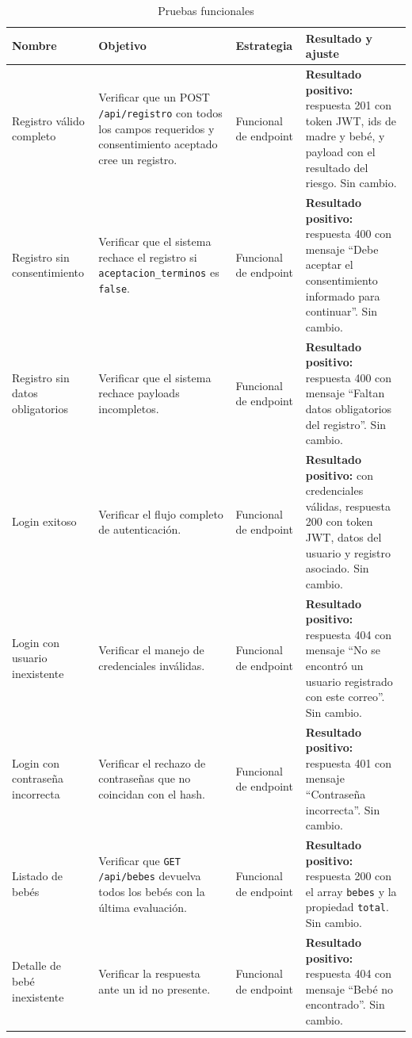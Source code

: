 \documentclass[12pt,letterpaper]{article}
\begin{document}
\begin{longtable}{p{}p{}p{}p{}}
\caption{Pruebas funcionales}\\\toprule
\textbf{Nombre} & \textbf{Objetivo} & \textbf{Estrategia} & \textbf{Resultado y ajuste} \\\midrule
\endhead
Registro válido completo & Verificar que un POST \texttt{/api/registro} con todos los campos requeridos y consentimiento aceptado cree un registro. & Funcional de endpoint & \textbf{Resultado positivo:} respuesta 201 con token JWT, ids de madre y bebé, y payload con el resultado del riesgo. Sin cambio.\\\hline
Registro sin consentimiento & Verificar que el sistema rechace el registro si \texttt{aceptacion\_terminos} es \texttt{false}. & Funcional de endpoint & \textbf{Resultado positivo:} respuesta 400 con mensaje ``Debe aceptar el consentimiento informado para continuar''. Sin cambio.\\\hline
Registro sin datos obligatorios & Verificar que el sistema rechace payloads incompletos. & Funcional de endpoint & \textbf{Resultado positivo:} respuesta 400 con mensaje ``Faltan datos obligatorios del registro''. Sin cambio.\\\hline
Login exitoso & Verificar el flujo completo de autenticación. & Funcional de endpoint & \textbf{Resultado positivo:} con credenciales válidas, respuesta 200 con token JWT, datos del usuario y registro asociado. Sin cambio.\\\hline
Login con usuario inexistente & Verificar el manejo de credenciales inválidas. & Funcional de endpoint & \textbf{Resultado positivo:} respuesta 404 con mensaje ``No se encontró un usuario registrado con este correo''. Sin cambio.\\\hline
Login con contraseña incorrecta & Verificar el rechazo de contraseñas que no coincidan con el hash. & Funcional de endpoint & \textbf{Resultado positivo:} respuesta 401 con mensaje ``Contraseña incorrecta''. Sin cambio.\\\hline
Listado de bebés & Verificar que \texttt{GET /api/bebes} devuelva todos los bebés con la última evaluación. & Funcional de endpoint & \textbf{Resultado positivo:} respuesta 200 con el array \texttt{bebes} y la propiedad \texttt{total}. Sin cambio.\\\hline
Detalle de bebé inexistente & Verificar la respuesta ante un id no presente. & Funcional de endpoint & \textbf{Resultado positivo:} respuesta 404 con mensaje ``Bebé no encontrado''. Sin cambio.\\\hline

\end{longtable}
\end{document}
